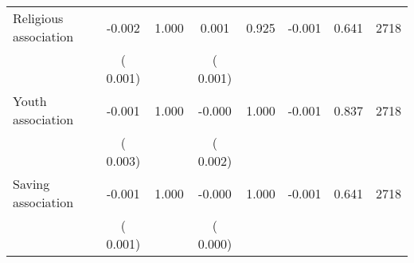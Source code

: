 \begin{tabular}{l*{7}{c}}
 Religious association       &             -0.002       &        1.000  &              0.001       &        0.925  &             -0.001       &              0.641 &  2718 \\ 
                       &       (       0.001)             &                               &       (       0.001)                     &                               &                                               &                                &                      \\ 

 Youth association       &             -0.001       &        1.000  &             -0.000       &        1.000  &             -0.001       &              0.837 &  2718 \\ 
                       &       (       0.003)             &                               &       (       0.002)                     &                               &                                               &                                &                      \\ 

 Saving association       &             -0.001       &        1.000  &             -0.000       &        1.000  &             -0.001       &              0.641 &  2718 \\ 
                       &       (       0.001)             &                               &       (       0.000)                     &                               &                                               &                                &                      \\ 

\hline \end{tabular}